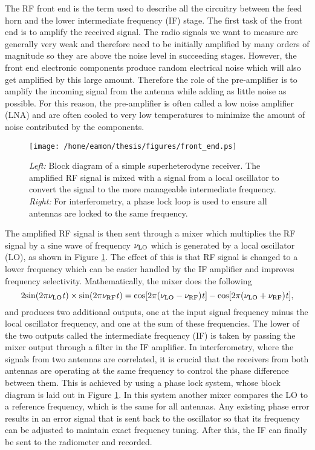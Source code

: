 The RF front end is the term used to describe all the circuitry between  the feed horn and the lower intermediate frequency (IF) stage. The first task of the front end is to amplify the received signal. The radio signals we want to measure are generally very weak and therefore need to be initially amplified by many orders of magnitude so they are above the noise level in succeeding stages. However, the front end electronic components produce random electrical noise which will also get amplified by this large amount. Therefore the role of the pre-amplifier is to amplify the incoming signal from the antenna while adding as little noise as possible. For this reason, the pre-amplifier is often called a low noise amplifier (LNA) and are often cooled to very low temperatures to minimize the amount of noise contributed by the components.

\begin{figure}[hbt!]
\centering 
          \texttt{[image: /home/eamon/thesis/figures/front\_end.ps]}
\caption[Block diagram of a superheterodyne receiver.]{\textit{Left:} Block diagram of a simple superheterodyne receiver. The amplified RF signal is mixed with a signal from a local oscillator to convert the signal to the more manageable intermediate frequency. \textit{Right:} For interferometry, a phase lock loop is used to ensure all antennas are locked to the same frequency.}
\label{fig2.3}
\end{figure}

The amplified RF signal is then sent through a mixer which multiplies the RF signal by a sine wave of frequency $\nu _{\rm{LO}}$ which is generated by a local oscillator (LO), as shown in Figure \ref{fig2.3}. The effect of this is that RF signal is changed to a lower frequency which can be easier handled by the IF amplifier and  improves frequency selectivity. Mathematically, the mixer does the following
\begin{equation}
2\rm{sin}(2\pi \nu _{\rm{LO}}\mathit{t})\times \rm{sin}(2\pi \nu _{\rm{RF}}\mathit{t}) = \rm{cos}[2\pi (\nu _{\rm{LO}}-\nu _{\rm{RF}})\mathit{t}]-\rm{cos}[2\pi (\nu _{\rm{LO}}+\nu _{\rm{RF}})\mathit{t}],
\end{equation}
and produces two additional outputs, one at the input signal frequency minus the local oscillator frequency, and one at the sum of these frequencies. The lower of the two outputs called the intermediate frequency (IF) is taken by passing the mixer output through a filter in the IF amplifier. In interferometry, where the signals from two antennas are correlated, it is crucial that the receivers from both antennas are operating at the same frequency to control the phase difference between them. This is achieved by using a phase lock system, whose block diagram is laid out in Figure \ref{fig2.3}. In this system another mixer compares the LO to a reference frequency, which is the same for all antennas. Any existing phase error results in an error signal that is sent back to the oscillator so that its frequency can be adjusted to maintain exact frequency tuning. After this, the IF can finally be sent to the radiometer and recorded.

